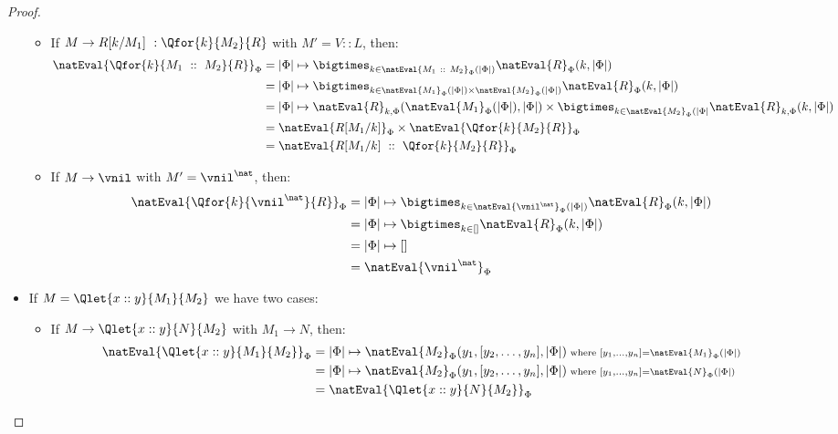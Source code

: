 \begin{proof}
\begin{itemize}
\begin{itemize}
            \item If $M\to R[k/M_1]\ : \Qfor{k}{M_2}{R}$ with $M' = V::L$, then: 
            \begin{align*}
                \natEval{\Qfor{k}{M_1\ ::\ M_2}{R}}_\Phi &= |\Phi| \mapsto \bigtimes_{k\in \natEval{M_1\ ::\ M_2}_\Phi(|\Phi|)} \natEval{R}_\Phi(k, |\Phi|)\\
                &= |\Phi| \mapsto \bigtimes_{k\in \natEval{M_1}_\Phi(|\Phi|) \times \natEval{M_2}_\Phi(|\Phi|)} \natEval{R}_\Phi(k, |\Phi|)\\
                &= |\Phi| \mapsto \natEval{R}_{k,\Phi}(\natEval{M_1}_\Phi(|\Phi|), |\Phi|) \times \bigtimes_{k\in \natEval{M_2}_\Phi(|\Phi|} \natEval{R}_{k,\Phi}(k, |\Phi|)\\
                &= \natEval{R[M_1/k]}_{\Phi} \times \natEval{\Qfor{k}{M_2}{R}}_\Phi\\
                &= \natEval{R[M_1/k]\ ::\ \Qfor{k}{M_2}{R}}_\Phi\\
            \end{align*}

            \item If $M\to \vnil$ with $M' = \vnil^\nat$, then: 
            \begin{align*}
                \natEval{\Qfor{k}{\vnil^\nat}{R}}_\Phi &= |\Phi| \mapsto \bigtimes_{k\in \natEval{\vnil^\nat}_\Phi(|\Phi|)} \natEval{R}_\Phi(k, |\Phi|)\\
                &= |\Phi| \mapsto \bigtimes_{k\in []} \natEval{R}_\Phi(k, |\Phi|)\\
                &= |\Phi| \mapsto []\\
                &= \natEval{\vnil^\nat}_\Phi
            \end{align*}
        \end{itemize}

        \item If $M = \Qlet{x::y}{M_1}{M_2}$ we have two cases:
        \begin{itemize}
            \item If $M\to \Qlet{x::y}{N}{M_2}$ with $M_1\to N$, then: 
            \begin{align*}
            \natEval{\Qlet{x::y}{M_1}{M_2}}_\Phi &= |\Phi|\mapsto \natEval{M_2}_\Phi(y_1,[y_2,\dots,y_n],|\Phi|){\scriptstyle{\text{ where } [y_1,\dots,y_n] = \natEval{M_1}_\Phi(|\Phi|)}}\\
            &= |\Phi|\mapsto 
            \natEval{M_2}_\Phi(y_1,[y_2,\dots,y_n],|\Phi|)
        {\scriptstyle{\text{ where } [y_1,\dots,y_n] = \natEval{N}_\Phi(|\Phi|)}}\\
            &= \natEval{\Qlet{x::y}{N}{M_2}}_\Phi
            \end{align*}


\end{itemize}
\end{itemize}
\end{proof}
